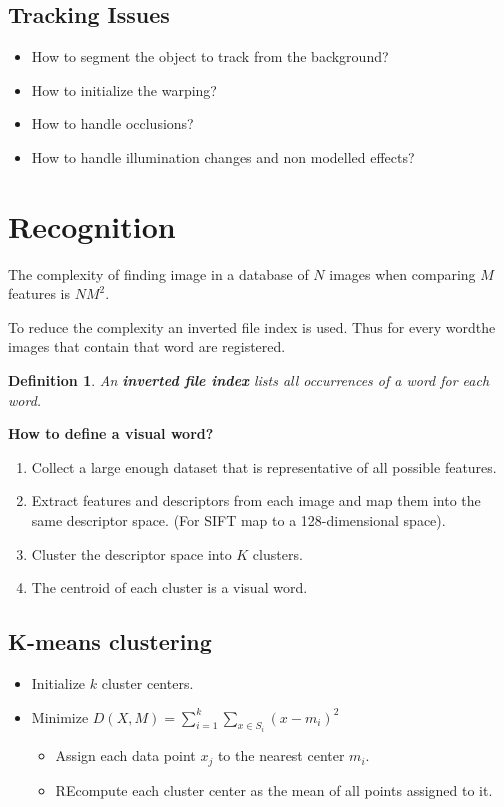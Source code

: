 \documentclass[10pt,a4paper]{scrartcl}
\newtheorem{define}{Definition}
\begin{document}
\begin{multicols*}{2}
\subsection{Tracking Issues}

\begin{itemize}
\item How to segment the object to track from the background?
\item How to initialize the warping?
\item How to handle occlusions?
\item How to handle illumination changes and non modelled effects?
\end{itemize}

\section{Recognition}

The complexity of finding image in a database of $N$ images when comparing $M$ features is $NM^2$.

\vspace{3ex}

To reduce the complexity an inverted file index is used. Thus for every \glqq word\grqq  the images that contain that word are registered.

\begin{define}
An \textbf{inverted file index} lists all occurrences of a word for each word.
\end{define}

\vspace{3ex}
\textbf{How to define a visual \glqq word\grqq?}
\begin{enumerate}
\item Collect a large enough dataset that is representative of all possible features.
\item Extract features and descriptors from each image and map them into the same descriptor space. (For SIFT map to a 128-dimensional space).
\item Cluster the descriptor space into $K$ clusters.
\item The centroid of each cluster is a visual word.
\end{enumerate}

\subsection{K-means clustering}

\begin{itemize}
\item Initialize $k$ cluster centers.
\item Minimize $D(X,M) = \sum\limits_{i=1}^k\sum\limits_{x\in S_i}(x-m_i)^2$
\begin{itemize}
\item Assign each data point $x_j$ to the nearest center $m_i$.
\item REcompute each cluster center as the mean of all points assigned to it.
\end{itemize}
\end{itemize}


\end{multicols*}
\end{document}
